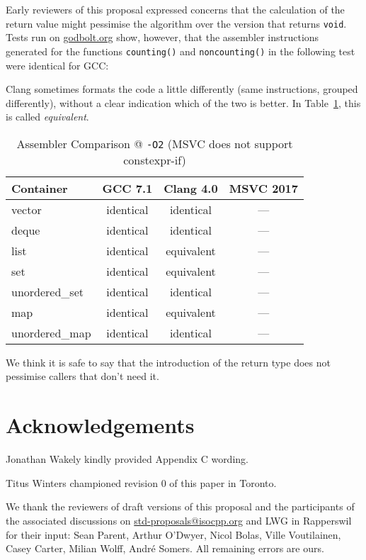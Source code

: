 \documentclass[11pt]{article}
\begin{document}
Early reviewers of this proposal expressed concerns that the
calculation of the return value might pessimise the algorithm over the
version that returns \texttt{void}. Tests run on \url{godbolt.org}
show, however, that the assembler instructions generated for the
functions \texttt{counting()} and \texttt{noncounting()} in the
following test were identical for GCC:



Clang sometimes formats the code a little differently (same
instructions, grouped differently), without a clear indication which
of the two is better. In Table~\ref{tab:asm}, this is called
\emph{equivalent}.

\begin{table}
  \centering
  \begin{tabular}[t]{|l||c|c|c|}
    \hline
    Container      & GCC 7.1   & Clang 4.0  & MSVC 2017 \\ \hline\hline
    vector         & identical & identical  & --- \\
    deque          & identical & identical  & --- \\
    list           & identical & equivalent & --- \\
    set            & identical & equivalent & --- \\
    unordered\_set & identical & identical  & --- \\
    map            & identical & equivalent & --- \\
    unordered\_map & identical & identical  & --- \\ \hline
  \end{tabular}
  \caption{Assembler Comparison @ \texttt{-O2} (MSVC does not support constexpr-if)}
  \label{tab:asm}
\end{table}

We think it is safe to say that the introduction of the return type
does not pessimise callers that don't need it.

\section{Acknowledgements}

Jonathan Wakely kindly provided Appendix C wording.

Titus Winters championed revision 0 of this paper in Toronto.

We thank the reviewers of draft versions of this proposal and the
participants of the associated discussions on
\url{std-proposals@isocpp.org} and LWG in Rapperswil for their input:
Sean Parent, Arthur O'Dwyer, Nicol Bolas, Ville Voutilainen, Casey
Carter, Milian Wolff, Andr\'e Somers. All remaining errors are ours.
\end{document}
